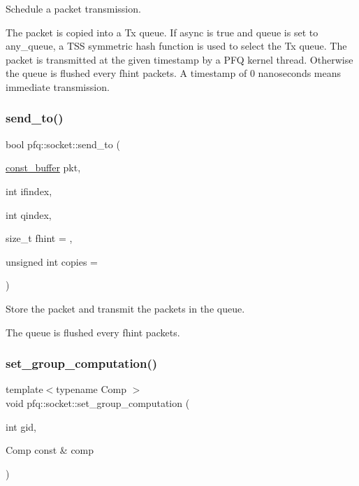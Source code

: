 Schedule a packet transmission. 

The packet is copied into a Tx queue. If \textquotesingle{}async\textquotesingle{} is true and \textquotesingle{}queue\textquotesingle{} is set to any\+\_\+queue, a T\+SS symmetric hash function is used to select the Tx queue. The packet is transmitted at the given timestamp by a P\+FQ kernel thread. Otherwise the queue is flushed every \textquotesingle{}fhint\textquotesingle{} packets. A timestamp of 0 nanoseconds means immediate transmission. \mbox{\label{classpfq_1_1socket_a3fddba43aa4da1f30fc04cdc3556054a}} 
\subsubsection{\texorpdfstring{send\+\_\+to()}{send\_to()}}
{\footnotesize\ttfamily bool pfq\+::socket\+::send\+\_\+to (\begin{DoxyParamCaption}\item[{\hyperlink{namespacepfq_ac835a1bd09b4cbaba61c100b50d0a99f}{const\+\_\+buffer}}]{pkt,  }\item[{int}]{ifindex,  }\item[{int}]{qindex,  }\item[{size\+\_\+t}]{fhint = {},  }\item[{unsigned int}]{copies = {} }\end{DoxyParamCaption})\hspace{0.3cm}{\ttfamily [inline]}}



Store the packet and transmit the packets in the queue. 

The queue is flushed every fhint packets. \mbox{\label{classpfq_1_1socket_a5cb37765ffcb1b78c5d61211f9e806df}} 
\subsubsection{\texorpdfstring{set\+\_\+group\+\_\+computation()}{set\_group\_computation()}\hspace{0.1cm}{\footnotesize\ttfamily [1/4]}}
{\footnotesize\ttfamily template$<$typename Comp $>$ \\
void pfq\+::socket\+::set\+\_\+group\+\_\+computation (\begin{DoxyParamCaption}\item[{int}]{gid,  }\item[{Comp const \&}]{comp }\end{DoxyParamCaption})\hspace{0.3cm}{\ttfamily [inline]}}



